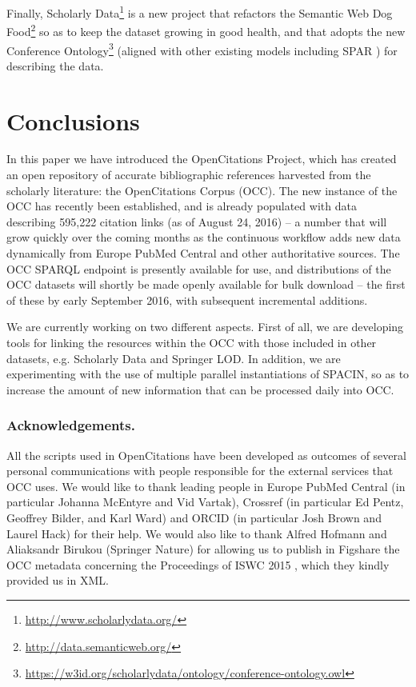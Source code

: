 \documentclass[runningheads,a4paper]{llncs}
\begin{document}
Finally, Scholarly Data\footnote{\url{http://www.scholarlydata.org/}} \cite{__RefNumPara__75_1852566440} is a new project that refactors the Semantic Web Dog Food\footnote{\url{http://data.semanticweb.org/}} so as to keep the dataset growing in good health, and that adopts the new Conference Ontology\footnote{\url{https://w3id.org/scholarlydata/ontology/conference-ontology.owl}} (aligned with other existing models including SPAR  \cite{__RefNumPara__17_1852566440}) for describing the data.

\section{Conclusions}\label{__RefHeading__171_1852566440}

In this paper we have introduced the OpenCitations Project, which has created an open repository of accurate bibliographic references harvested from the scholarly literature: the OpenCitations Corpus (OCC). The new instance of the OCC has recently been established, and is already populated with data describing 595,222 citation links (as of August 24, 2016) -- a number that will grow quickly over the coming months as the continuous workflow adds new data dynamically from Europe PubMed Central and other authoritative sources. The OCC SPARQL endpoint is presently available for use, and distributions of the OCC datasets will shortly be made openly available for bulk download -- the first of these by early September 2016, with subsequent incremental additions.

We are currently working on two different aspects. First of all, we are developing tools for linking the resources within the OCC with those included in other datasets, e.g. Scholarly Data and Springer LOD. In addition, we are experimenting with the use of multiple parallel instantiations of SPACIN, so as to increase the amount of new information that can be processed daily into OCC. 

\subsubsection*{Acknowledgements.}All the scripts used in OpenCitations have been developed as outcomes of several personal communications with people responsible for the external services that OCC uses. We would like to thank leading people in Europe PubMed Central (in particular Johanna McEntyre and Vid Vartak), Crossref (in particular Ed Pentz, Geoffrey Bilder, and Karl Ward) and ORCID (in particular Josh Brown and Laurel Hack) for their help. We would also like to thank Alfred Hofmann and Aliaksandr Birukou (Springer Nature) for allowing us to publish in Figshare the OCC metadata concerning the Proceedings of ISWC 2015  \cite{__RefNumPara__5447_1890349413}, which they kindly provided us in XML.
\end{document}
